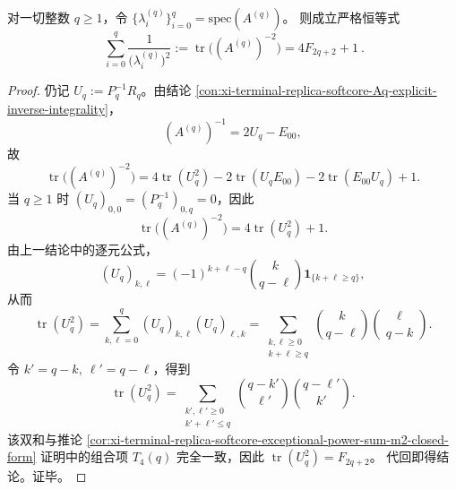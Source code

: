 \begin{corollary}\label{cor:xi-terminal-replica-softcore-exceptional-reciprocal-square-sum-fibonacci}
对一切整数 \(q\ge 1\)，令 \(\{\lambda_i^{(q)}\}_{i=0}^{q}=\mathrm{spec}(A^{(q)})\)。
则成立严格恒等式
\[
\boxed{\ \sum_{i=0}^{q}\frac{1}{\bigl(\lambda_i^{(q)}\bigr)^2}
:=\operatorname{tr}\bigl((A^{(q)})^{-2}\bigr)
=4F_{2q+2}+1\ } .
\]
\end{corollary}
\begin{proof}
仍记 \(U_q:=P_q^{-1}R_q\)。由结论 \ref{con:xi-terminal-replica-softcore-Aq-explicit-inverse-integrality}，
\[
(A^{(q)})^{-1}=2U_q-E_{00},
\]
故
\[
\operatorname{tr}\bigl((A^{(q)})^{-2}\bigr)
=4\operatorname{tr}(U_q^2)-2\operatorname{tr}(U_qE_{00})-2\operatorname{tr}(E_{00}U_q)+1.
\]
当 \(q\ge1\) 时 \((U_q)_{0,0}=(P_q^{-1})_{0,q}=0\)，因此
\[
\operatorname{tr}\bigl((A^{(q)})^{-2}\bigr)=4\operatorname{tr}(U_q^2)+1.
\]
由上一结论中的逐元公式，
\[
(U_q)_{k,\ell}=(-1)^{k+\ell-q}\binom{k}{q-\ell}\mathbf 1_{\{k+\ell\ge q\}},
\]
从而
\[
\operatorname{tr}(U_q^2)
=\sum_{k,\ell=0}^{q}(U_q)_{k,\ell}(U_q)_{\ell,k}
=\sum_{\substack{k,\ell\ge0\\k+\ell\ge q}}
\binom{k}{q-\ell}\binom{\ell}{q-k}.
\]
令 \(k'=q-k,\ \ell'=q-\ell\)，得到
\[
\operatorname{tr}(U_q^2)
=\sum_{\substack{k',\ell'\ge0\\k'+\ell'\le q}}
\binom{q-k'}{\ell'}\binom{q-\ell'}{k'}.
\]
该双和与推论 \ref{cor:xi-terminal-replica-softcore-exceptional-power-sum-m2-closed-form}
证明中的组合项 \(T_4(q)\) 完全一致，因此
\(
\operatorname{tr}(U_q^2)=F_{2q+2}
\)。
代回即得结论。证毕。
\end{proof}

